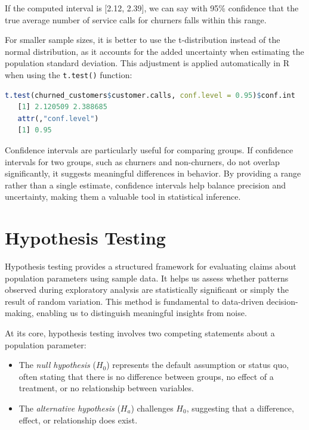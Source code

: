 \documentclass[
]{book}
\newcommand{\passthrough}[1]{#1}
\providecommand{\tightlist}{%
  \setlength{\itemsep}{0pt}\setlength{\parskip}{0pt}}
\theoremstyle{definition}
\theoremstyle{definition}
\theoremstyle{definition}
\theoremstyle{definition}
\theoremstyle{remark}
\begin{document}
If the computed interval is {[}2.12, 2.39{]}, we can say with 95\% confidence that the true average number of service calls for churners falls within this range.

For smaller sample sizes, it is better to use the t-distribution instead of the normal distribution, as it accounts for the added uncertainty when estimating the population standard deviation. This adjustment is applied automatically in R when using the \passthrough{\lstinline!t.test()!} function:

\begin{lstlisting}[language=R]
t.test(churned_customers$customer.calls, conf.level = 0.95)$conf.int
   [1] 2.120509 2.388685
   attr(,"conf.level")
   [1] 0.95
\end{lstlisting}

Confidence intervals are particularly useful for comparing groups. If confidence intervals for two groups, such as churners and non-churners, do not overlap significantly, it suggests meaningful differences in behavior. By providing a range rather than a single estimate, confidence intervals help balance precision and uncertainty, making them a valuable tool in statistical inference.

\section{Hypothesis Testing}\label{hypothesis-testing}

Hypothesis testing provides a structured framework for evaluating claims about population parameters using sample data. It helps us assess whether patterns observed during exploratory analysis are statistically significant or simply the result of random variation. This method is fundamental to data-driven decision-making, enabling us to distinguish meaningful insights from noise.

At its core, hypothesis testing involves two competing statements about a population parameter:

\begin{itemize}
\tightlist
\item
  The \emph{null hypothesis} (\(H_0\)) represents the default assumption or status quo, often stating that there is no difference between groups, no effect of a treatment, or no relationship between variables.\\
\item
  The \emph{alternative hypothesis} (\(H_a\)) challenges \(H_0\), suggesting that a difference, effect, or relationship does exist.
\end{itemize}
\end{document}
